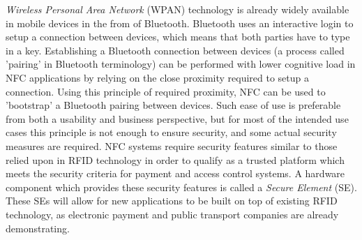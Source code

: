 \textit{Wireless Personal Area Network} (WPAN) technology is already widely available in mobile devices in the from of Bluetooth.
Bluetooth uses an interactive login to setup a connection between devices, which means that both parties have to type in a key.
Establishing a Bluetooth connection between devices (a process called 'pairing' in Bluetooth terminology) can be performed with lower cognitive load in NFC applications by relying on the close proximity required to setup a connection.
Using this principle of required proximity, NFC can be used to 'bootstrap' a Bluetooth pairing between devices.
Such ease of use is preferable from both a usability and business perspective, but for most of the intended use cases this principle is not enough to ensure security, and some actual security measures are required.
NFC systems require security features similar to those relied upon in RFID technology in order to qualify as a trusted platform which meets the security criteria for payment and access control systems.
A hardware component which provides these security features is called a \textit{Secure Element} (SE).
These SEs will allow for new applications to be built on top of existing RFID technology, as electronic payment and public transport companies are already demonstrating.





